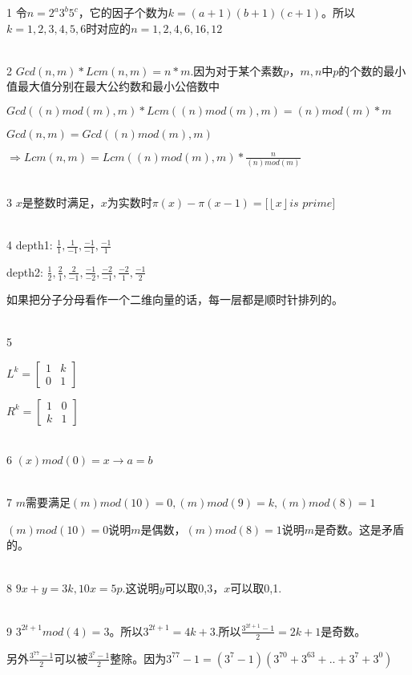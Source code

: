 \documentclass[onecolumn]{article}
\begin{document}
1 令$n=2^{a}3^{b}5^{c}$，它的因子个数为$k=(a+1)(b+1)(c+1)$。所以$k=1,2,3,4,5,6$时对应的$n=1,2,4,6,16,12$ \par
~\\
2 $Gcd(n,m)*Lcm(n,m)=n*m$.因为对于某个素数$p$，$m,n$中$p$的个数的最小值最大值分别在最大公约数和最小公倍数中\par
$Gcd((n)mod(m),m)*Lcm((n)mod(m),m)=(n)mod(m)*m$\par
$Gcd(n,m)=Gcd((n)mod(m),m)$ \par
$\Rightarrow Lcm(n,m)=Lcm((n)mod(m),m)*\frac{n}{(n)mod(m)}$\par
~\\
3 $x$是整数时满足，$x$为实数时$\pi (x)-\pi(x-1)=[\left \lfloor x \right \rfloor is$ $prime]$\par
~\\
4 depth1: $\frac{1}{1},\frac{1}{-1},\frac{-1}{-1},\frac{-1}{1}$\par
depth2: $\frac{1}{2},\frac{2}{1},\frac{2}{-1},\frac{-1}{-2},\frac{-2}{-1},\frac{-2}{1},\frac{-1}{2}$ \par
如果把分子分母看作一个二维向量的话，每一层都是顺时针排列的。 \par
~\\
5 \par
$L^{k}=\begin{bmatrix}
1 & k\\
0 & 1
\end{bmatrix}$ \par
$R^{k}=\begin{bmatrix}
1 & 0\\ 
k & 1
\end{bmatrix}$ \par
~\\
6 $(x)mod(0)=x\rightarrow a=b$ \par
~\\
7 $m$需要满足$(m)mod(10)=0,(m)mod(9)=k,(m)mod(8)=1$  \par
$(m)mod(10)=0$说明$m$是偶数，$(m)mod(8)=1$说明$m$是奇数。这是矛盾的。\par
~\\
8 $9x+y=3k,10x=5p$.这说明$y$可以取0,3，$x$可以取0,1.\par
~\\
9 $3^{2t+1}mod(4)=3$。所以$3^{2t+1}=4k+3$.所以$\frac{3^{2t+1}-1}{2}=2k+1$是奇数。\par
另外$\frac{3^{77}-1}{2}$可以被$\frac{3^{7}-1}{2}$整除。因为$3^{77}-1=(3^{7}-1)(3^{70}+3^{63}+..+3^{7}+3^{0})$\par
~\\
\end{document}
